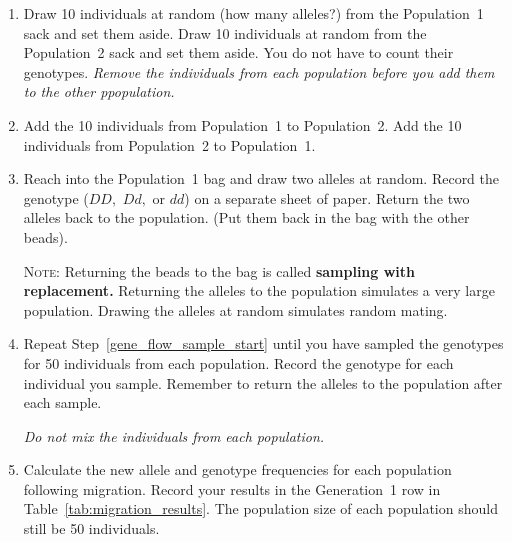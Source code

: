 \documentclass[12pt]{exam}
\newcommand{\allele}[1]{$#1$}
\begin{document}
\begin{questions}
\begin{enumerate}
%	
%	

	\item Draw 10 individuals at random (how many alleles?) from the Population~1 sack and set them aside. Draw 10 individuals at random from the Population~2 sack and set them aside. You do not have to count their genotypes. \emph{Remove the individuals from each population before you add them to the other ppopulation.}
	
	\item Add the 10 individuals from Population~1 to Population~2. Add the 10 individuals from Population~2 to Population~1. 
	
	\item \label{gene_flow_sample_start} Reach into the Population~1 bag and draw two alleles at random. Record the genotype (\allele{DD,} \allele{Dd,} or \allele{dd}) on a separate sheet of paper. Return the two alleles back to the population. (Put them back in the bag with the other beads).
	
	\textsc{Note:} Returning the beads to the bag is called \textbf{sampling with replacement.} Returning the alleles to the population simulates a very large population. Drawing the alleles at random simulates random mating.
	
	\item Repeat Step~\ref{gene_flow_sample_start} until you have sampled the genotypes for 50 individuals from each population. Record the genotype for each individual you sample. Remember to return the alleles to the population after each sample. 

 	\emph{Do not mix the individuals from each population.}
	
	\item Calculate the new allele and genotype frequencies for each population following migration. Record your results in the Generation~1 row in Table~\ref{tab:migration_results}. The population size of each population should still be 50 individuals.
	

\end{enumerate}
\end{questions}
\end{document}
